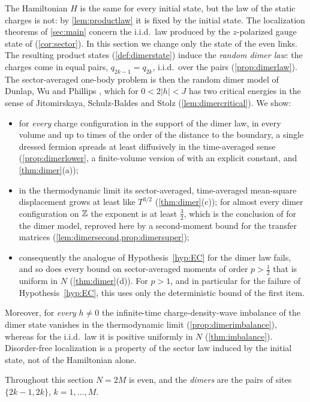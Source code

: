 The Hamiltonian $H$ is the same for every initial state, but the law of the static charges is not:
by \cref{lem:productlaw} it is fixed by the initial state.  The localization theorems of
\cref{sec:main} concern the i.i.d.\ law produced by the $z$-polarized gauge state of
\cite{SKKM2017} (\cref{cor:sector}).  In this section we change only the state of the even links.
The resulting product states (\cref{def:dimerstate}) induce the \emph{random dimer law}: the charges
come in equal pairs, $q_{2k-1}=q_{2k}$, i.i.d.\ over the pairs (\cref{prop:dimerlaw}).  The
sector-averaged one-body problem is then the random dimer model of Dunlap, Wu and Phillips
\cite{DWP1990}, which for $0<2|h|<J$ has two critical energies in the sense of Jitomirskaya,
Schulz-Baldes and Stolz \cite{JSBS2003} (\cref{lem:dimercritical}).  We show:
\begin{itemize}
\item for \emph{every} charge configuration in the support of the dimer law, in every volume and up
to times of the order of the distance to the boundary, a single dressed fermion spreads at least
diffusively in the time-averaged sense (\cref{prop:dimerlower}, a finite-volume version of
\cite[Thm.~1]{JSBS2003} with an explicit constant, and \cref{thm:dimer}(a));
\item in the thermodynamic limit its sector-averaged, time-averaged mean-square displacement grows at
least like $T^{3/2}$ (\cref{thm:dimer}(c)); for almost every dimer configuration on $\mathbb{Z}$ the exponent is at least $\frac32$, which is
the conclusion of \cite[Thm.~4]{JSBS2003} for the dimer model, reproved here by a second-moment bound for the
transfer matrices (\cref{lem:dimersecond,prop:dimersuper});
\item consequently the analogue of Hypothesis~\ref{hyp:EC} for the dimer law fails, and so does every
bound on sector-averaged moments of order $p>\frac12$ that is uniform in $N$ (\cref{thm:dimer}(d)).  For
$p>1$, and in particular for the failure of Hypothesis~\ref{hyp:EC}, this uses only the deterministic
bound of the first item.
\end{itemize}
Moreover, for \emph{every} $h\neq0$ the infinite-time charge-density-wave imbalance of the dimer
state vanishes in the thermodynamic limit (\cref{prop:dimerimbalance}), whereas for the i.i.d.\ law
it is positive uniformly in $N$ (\cref{thm:imbalance}).  Disorder-free localization is a property of
the sector law induced by the initial state, not of the Hamiltonian alone.

Throughout this section $N=2M$ is even, and the \emph{dimers} are the pairs of sites $\{2k-1,2k\}$,
$k=1,\dots,M$.


